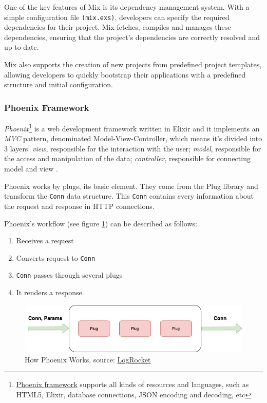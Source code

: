 One of the key features of Mix is its dependency management system. With a simple configuration file \texttt{(mix.exs)}, developers can specify the required dependencies for their project. Mix fetches, compiles and manages these dependencies, ensuring that the project's dependencies are correctly resolved and up to date.

Mix also supports the creation of new projects from predefined project templates, allowing developers to quickly bootstrap their applications with a predefined structure and initial configuration.\newline


\subsubsection{Phoenix Framework}

\textit{Phoenix}\footnote{\href{https://www.phoenixframework.org}{Phoenix framework} supports all kinds of resources and languages, such as HTML5, Elixir, database connections, JSON encoding and decoding, etc} is a web development framework written in Elixir and it implements an \textit{MVC} pattern, denominated Model-View-Controller, which means it's divided into 3 layers: \textit{view}, responsible for the interaction with the user; \textit{model}, responsible for the access and manipulation of the data; \textit{controller}, responsible for connecting model and view \cite{phoenix}.\newline

Phoenix works by plugs, its basic element. They come from the Plug library and transform the \texttt{Conn} data structure. This \texttt{Conn} contains every information about the request and response in HTTP connections.\newline

Phoenix's workflow (see figure \ref{fig:phx_work}) can be described as follows:

\begin{enumerate}
    \item Receives a request
    \item Converts request to \texttt{Conn}
    \item \texttt{Conn} passes through several plugs
    \item It renders a response.
\end{enumerate}

\begin{figure}[htbp]
	\centering
	\includegraphics[scale=0.4]{figures/phx_work-3.png}  %
	\caption{How Phoenix Works, source: \href{https://blog.logrocket.com/build-rest-api-elixir-phoenix/}{LogRocket}}
	\label{fig:phx_work}
\end{figure}

